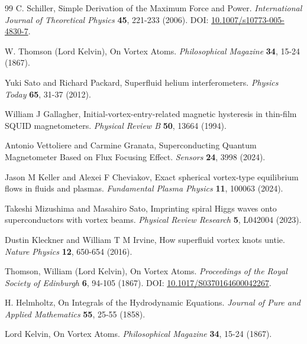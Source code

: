 \documentclass[a4paper,10pt]{article}
\begin{document}
\begin{thebibliography}{99}
C. Schiller,
\newblock Simple Derivation of the Maximum Force and Power.
\textit{International Journal of Theoretical Physics} \textbf{45}, 221-233 (2006).
\newblock DOI: \href{https://doi.org/10.1007/s10773-005-4830-7}{10.1007/s10773-005-4830-7}.


W. Thomson (Lord Kelvin),
\newblock On Vortex Atoms.
\textit{Philosophical Magazine} \textbf{34}, 15-24 (1867).


Yuki Sato and Richard Packard,
\newblock Superfluid helium interferometers.
\textit{Physics Today} \textbf{65}, 31-37 (2012).


William J Gallagher,
\newblock Initial-vortex-entry-related magnetic hysteresis in thin-film SQUID magnetometers.
\textit{Physical Review B} \textbf{50}, 13664 (1994).


Antonio Vettoliere and Carmine Granata,
\newblock Superconducting Quantum Magnetometer Based on Flux Focusing Effect.
\textit{Sensors} \textbf{24}, 3998 (2024).


Jason M Keller and Alexei F Cheviakov,
\newblock Exact spherical vortex-type equilibrium flows in fluids and plasmas.
\textit{Fundamental Plasma Physics} \textbf{11}, 100063 (2024).


Takeshi Mizushima and Masahiro Sato,
\newblock Imprinting spiral Higgs waves onto superconductors with vortex beams.
\textit{Physical Review Research} \textbf{5}, L042004 (2023).


Dustin Kleckner and William T M Irvine,
\newblock How superfluid vortex knots untie.
\textit{Nature Physics} \textbf{12}, 650-654 (2016).


Thomson, William (Lord Kelvin),
\newblock On Vortex Atoms.
\textit{Proceedings of the Royal Society of Edinburgh} \textbf{6}, 94-105 (1867).
\newblock DOI: \href{https://doi.org/10.1017/S0370164600042267}{10.1017/S0370164600042267}.


H. Helmholtz,
\newblock On Integrals of the Hydrodynamic Equations.
\textit{Journal of Pure and Applied Mathematics} \textbf{55}, 25-55 (1858).


Lord Kelvin,
\newblock On Vortex Atoms.
\textit{Philosophical Magazine} \textbf{34}, 15-24 (1867).



\end{thebibliography}
\end{document}
